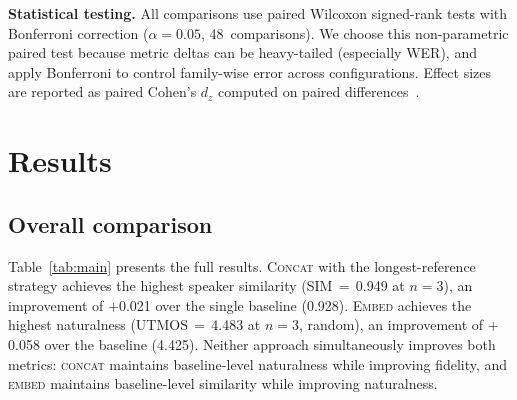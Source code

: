 \documentclass{Interspeech}
\begin{document}
\textbf{Statistical testing.}
All comparisons use paired Wilcoxon signed-rank tests with Bonferroni correction ($\alpha = 0.05$, 48~comparisons).
We choose this non-parametric paired test because metric deltas can be heavy-tailed (especially WER), and apply Bonferroni to control family-wise error across configurations.
Effect sizes are reported as paired Cohen's $d_z$ computed on paired differences~\cite{cohen1988}.

\section{Results}
\label{sec:results}

\subsection{Overall comparison}
\label{sec:overall}

Table~\ref{tab:main} presents the full results.
\textsc{Concat} with the longest-reference strategy achieves the highest speaker similarity (SIM\,$=$\,0.949 at $n{=}3$), an improvement of $+$0.021 over the single baseline (0.928).
\textsc{Embed} achieves the highest naturalness (UTMOS\,$=$\,4.483 at $n{=}3$, random), an improvement of $+$0.058 over the baseline (4.425).
Neither approach simultaneously improves both metrics: \textsc{concat} maintains baseline-level naturalness while improving fidelity, and \textsc{embed} maintains baseline-level similarity while improving naturalness.
\end{document}

